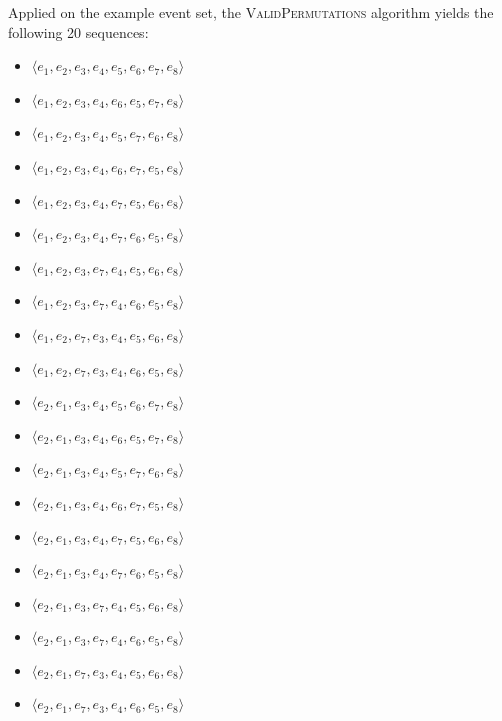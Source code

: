 Applied on the example event set, the \textsc{ValidPermutations} algorithm yields the following 20 sequences:
\begin{itemize}
\item $\langle e_1,e_2,e_3,e_4,e_5,e_6,e_7,e_8\rangle$ 
\item $\langle e_1,e_2,e_3,e_4,e_6,e_5,e_7,e_8\rangle$ 
\item $\langle e_1,e_2,e_3,e_4,e_5,e_7,e_6,e_8\rangle$
\item $\langle e_1,e_2,e_3,e_4,e_6,e_7,e_5,e_8\rangle$ 
\item $\langle e_1,e_2,e_3,e_4,e_7,e_5,e_6,e_8\rangle$
\item $\langle e_1,e_2,e_3,e_4,e_7,e_6,e_5,e_8\rangle$
\item $\langle e_1,e_2,e_3,e_7,e_4,e_5,e_6,e_8\rangle$
\item $\langle e_1,e_2,e_3,e_7,e_4,e_6,e_5,e_8\rangle$
\item $\langle e_1,e_2,e_7,e_3,e_4,e_5,e_6,e_8\rangle$
\item $\langle e_1,e_2,e_7,e_3,e_4,e_6,e_5,e_8\rangle$
\item $\langle e_2,e_1,e_3,e_4,e_5,e_6,e_7,e_8\rangle$ 
\item $\langle e_2,e_1,e_3,e_4,e_6,e_5,e_7,e_8\rangle$ 
\item $\langle e_2,e_1,e_3,e_4,e_5,e_7,e_6,e_8\rangle$
\item $\langle e_2,e_1,e_3,e_4,e_6,e_7,e_5,e_8\rangle$ 
\item $\langle e_2,e_1,e_3,e_4,e_7,e_5,e_6,e_8\rangle$
\item $\langle e_2,e_1,e_3,e_4,e_7,e_6,e_5,e_8\rangle$
\item $\langle e_2,e_1,e_3,e_7,e_4,e_5,e_6,e_8\rangle$
\item $\langle e_2,e_1,e_3,e_7,e_4,e_6,e_5,e_8\rangle$
\item $\langle e_2,e_1,e_7,e_3,e_4,e_5,e_6,e_8\rangle$
\item $\langle e_2,e_1,e_7,e_3,e_4,e_6,e_5,e_8\rangle$
\end{itemize}
%
%
%
%
%
%
%
